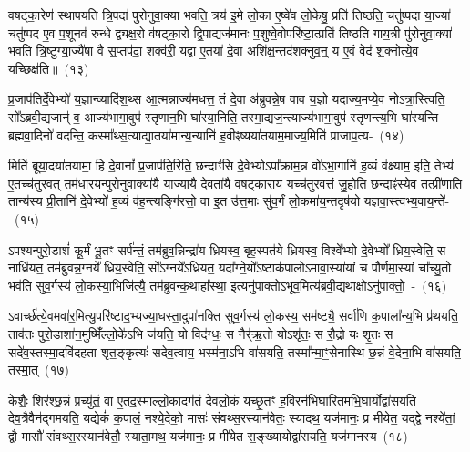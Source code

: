 वषट्का॒रेण॑ स्थापयति त्रि॒पदा॑ पुरोनुवा॒क्या॑ भवति॒ त्रय॑ इ॒मे लो॒का ए॒ष्वे॑व लो॒केषु॒ प्रति॑ तिष्ठति॒ चतु॑ष्पदा या॒ज्या॑ चतु॑ष्पद ए॒व प॒शूनव॑ रुन्धे द्व्यक्ष॒रो व॑षट्का॒रो द्वि॒पाद्यज॑मानः प॒शुष्वे॒वोपरि॑ष्टा॒त्प्रति॑ तिष्ठति गाय॒त्री पु॑रोनुवा॒क्या॑ भवति त्रि॒ष्टुग्या॒ज्यै॑षा वै स॒प्तप॑दा॒ शक्व॑री॒ यद्वा ए॒तया॑ दे॒वा अशि॑क्ष॒न्तद॑शक्नुव॒न्॒ य ए॒वं वेद॑ श॒क्नोत्ये॒व यच्छिक्ष॑ति॥~(१३)\ip

{\anuvakamend[{दे॒वता॑नाङ्करोत्यु॒परि॑ष्टाल्ल॒क्ष्मा\-ऽऽ\-ज्य॑भागौ॒ प्रति॑ श॒क्नोत्ये॒व द्वे च॑}]}

प्र॒जा\-प॑तिर्दे॒वेभ्यो॑ य॒ज्ञान्व्यादि॑श॒थ्स आ॒त्मन्नाज्य॑\-मधत्त॒ तं दे॒वा अ॑ब्रुवन्ने॒ष वाव य॒ज्ञो यदाज्य॒मप्ये॒व नो\-ऽत्रा॒स्त्विति॒ सो᳚\-ऽब्रवी॒द्यजान्॑ व॒ आज्य॑\-भागा॒वुप॑ स्तृणान॒भि घा॑रया॒निति॒ तस्मा॒द्\-यज॒न्त्याज्य॑\-भागा॒वुप॑ स्तृणन्त्य॒भि घा॑रयन्ति ब्रह्मवा॒दिनो॑ वदन्ति॒ कस्मा᳚थ्स॒त्याद्या॒तया॑\-मान्य॒न्यानि॑ ह॒वीꣴष्यया॑त\-याम॒माज्य॒\-मिति॑ प्राजाप॒त्य-~(१४)\ip

मिति॑ ब्रूया॒दया॑तयामा॒ हि दे॒वानां᳚ प्र॒जा\-प॑ति॒रिति॒ छन्दाꣳ॑सि दे॒वेभ्यो\-ऽपा᳚क्राम॒न्न वो॑\-ऽभा॒गानि॑ ह॒व्यं व॑क्ष्याम॒ इति॒ तेभ्य॑ ए॒तच्च॑तुरव॒त् तम॑धारयन्पुरोनुवा॒क्या॑यै या॒ज्या॑यै दे॒वता॑यै वषट्का॒राय॒ यच्च॑तुरव॒त्तं जु॒होति॒ छन्दाꣴ॑स्ये॒व तत्प्री॑णाति॒ तान्य॑स्य प्री॒तानि॑ दे॒वेभ्यो॑ ह॒व्यं व॑ह॒न्त्यङ्गि॑रसो॒ वा इ॒त उ॑त्त॒माः सु॑व॒र्गं लो॒कमा॑य॒न्तदृष॑यो यज्ञवा॒स्त्व॑भ्य॒वाय॒न्ते॑-~(१५)\ip

ऽपश्यन्पुरो॒डाशं॑ कू॒र्मं भू॒तꣳ सर्प॑न्तं॒ तम॑ब्रुव॒न्निन्द्रा॑य ध्रियस्व॒ बृह॒स्पत॑ये ध्रियस्व॒ विश्वे᳚भ्यो दे॒वेभ्यो᳚ ध्रिय॒स्वेति॒ स नाध्रि॑यत॒ तम॑ब्रुवन्न॒ग्नये᳚ ध्रिय॒स्वेति॒ सो᳚\-ऽग्नये᳚\-ऽध्रियत॒ यदा᳚ग्ने॒यो᳚\-ऽष्टाक॑पालो\-ऽमावा॒स्या॑यां च पौर्णमा॒स्यां चा᳚च्यु॒तो भव॑ति सुव॒र्गस्य॑ लो॒कस्या॒भिजि॑त्यै॒ तम॑ब्रुवन्क॒थाहा᳚स्था॒ इत्यनु॑पाक्तो\-ऽभूव॒मित्य॑ब्रवी॒द्यथाक्षो\-ऽनु॑पाक्तो॒~-~(१६)\ip

ऽवार्च्छ॑त्ये॒वमवा॑र॒मित्यु॒परि॑ष्टाद॒भ्यज्या॒धस्ता॒दुपा॑नक्ति सुव॒र्गस्य॑ लो॒कस्य॒ सम॑ष्ट्यै॒ सर्वा॑णि क॒पाला᳚न्य॒भि प्र॑थयति॒ ताव॑तः पुरो॒\-डाशा॑\-न॒मुष्मिँ॑ल्लो॒के॑\-ऽभि ज॑यति॒ यो विद॑ग्धः॒ स नैर्॑\mbox{}ऋ॒तो यो\-ऽशृ॑तः॒ स रौ॒द्रो यः शृ॒तः स सदे॑व॒स्तस्मा॒दवि॑दहता शृत॒ङ्कृत्यः॑ सदेव॒त्वाय॒ भस्म॑ना॒\-ऽभि वा॑सयति॒ तस्मा᳚न्मा॒ꣳ॒सेनास्थि॑ छ॒न्नं वे॒देना॒भि वा॑सयति॒ तस्मा॒त्~(१७)\ip

केशैः॒ शिर॑श्छ॒न्नं प्रच्यु॑तं॒ वा ए॒तद॒स्माल्लो॒कादग॑तं देवलो॒कं यच्छृ॒तꣳ ह॒विरन॑भि\-घारितमभि॒\-घार्योद्वा॑सयति देव॒त्रैवैन॑द्गमयति॒ यद्येकं॑ क॒पालं॒ नश्ये॒देको॒ मासः॑ संवथ्स॒रस्यान॑वेतः॒ स्यादथ॒ यज॑मानः॒ प्र मी॑येत॒ यद्द्वे नश्ये॑तां॒ द्वौ मासौ॑ संवथ्स॒रस्यान॑वेतौ॒ स्याता॒मथ॒ यज॑मानः॒ प्र मी॑येत स॒ङ्ख्यायोद्वा॑सयति॒ यज॑मानस्य~(१८)\ip

